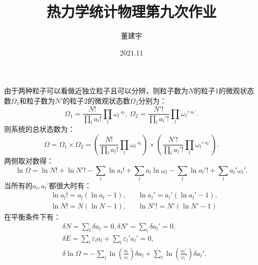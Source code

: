 \documentclass[a4paper,12pt]{article}
\title{热力学统计物理第九次作业}
\date{2021.11}
\author{董建宇}
\begin{document}
\maketitle 

\titleformat{\section}[hang]{\large}{\thesection}{0.8em}{}{}
\titleformat{\subsection}[hang]{\small}{\thesubsection}{0.8em}{}{}

\section{}
由于两种粒子可以看做近独立粒子且可以分辨，则粒子数为$N$的粒子1的微观状态数$\Omega_1$和粒子数为$N'$的粒子2的微观状态数$\Omega_2$分别为：
\begin{equation}\nonumber
	\Omega_1 = \frac{N!}{\prod\limits_{l}a_l!}\prod_{l}\omega_l\,^{a_l}, ~ \Omega_2 = \frac{N'!}{\prod\limits_l a_l'!}\prod_l \omega_l'\,^{a_l'}.
\end{equation}
则系统的总状态数为：
\begin{equation}\nonumber
	\Omega = \Omega_1 \times \Omega_2 = \left( \frac{N!}{\prod\limits_{l}a_l!}\prod_{l}\omega_l\,^{a_l} \right) \times \left( \frac{N'!}{\prod\limits_l a_l'!}\prod_l \omega_l'\,^{a_l'} \right).
\end{equation}
两侧取对数得：
\begin{equation}\nonumber
	\ln \Omega = \ln N! + \ln N'! - \sum_l \ln a_l! + \sum_l a_l \ln \omega_l - \sum_l \ln a_l'! + \sum_l a_l' \omega_l'.
\end{equation}
当所有的$a_l,a_l'$都很大时有：
\begin{equation}\nonumber
\begin{aligned}
	&\ln a_l! =a_l \left( \ln a_l - 1 \right), & &\ln a_l' = a_l' \left( \ln a_l' - 1 \right), \\
	&\ln N! = N \left( \ln N - 1 \right), & &\ln N'! = N' \left( \ln N' - 1 \right)
\end{aligned}
\end{equation}
在平衡条件下有：
\begin{equation}\nonumber
\begin{aligned}
	&\delta N = \sum_l \delta a_l = 0, \delta N' = \sum_l \delta a_l' = 0, \\
	&\delta E = \sum_l \varepsilon_l a_l + \sum_l \varepsilon_l' a_l' =0, \\
	&\delta \ln \Omega = -\sum_l \ln\left( \frac{a_l}{\omega_l} \right) \delta a_l + \sum_l \ln\left( \frac{a_l'}{\omega_l'} \right) \delta a_l'.
\end{aligned}
\end{equation}
\end{document}
